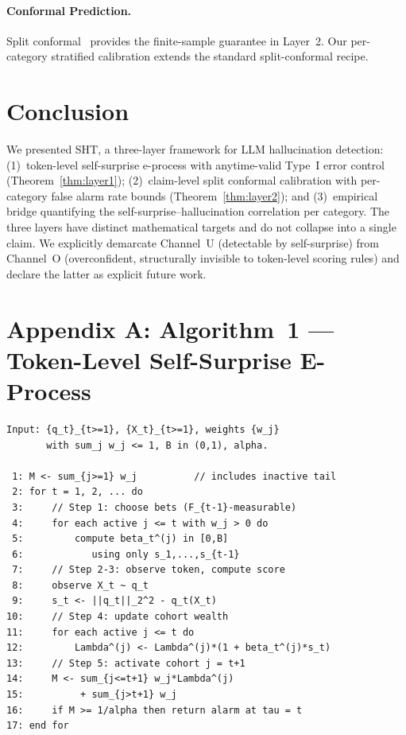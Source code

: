\documentclass[runningheads]{llncs}
\begin{document}
\paragraph{Conformal Prediction.}
Split conformal~\cite{vovk2005algorithmic,lei2018distribution} provides the
finite-sample guarantee in Layer~2. Our per-category stratified calibration
extends the standard split-conformal recipe.

\section{Conclusion}

We presented SHT, a three-layer framework for LLM hallucination detection:
(1)~token-level self-surprise e-process with anytime-valid Type~I error
control (Theorem~\ref{thm:layer1});
(2)~claim-level split conformal calibration with per-category false alarm
rate bounds (Theorem~\ref{thm:layer2}); and
(3)~empirical bridge quantifying the self-surprise--hallucination correlation
per category.
The three layers have distinct mathematical targets and do not collapse into
a single claim. We explicitly demarcate Channel~U (detectable by self-surprise)
from Channel~O (overconfident, structurally invisible to token-level scoring
rules) and declare the latter as explicit future work.

\section*{Appendix A: Algorithm~1 --- Token-Level Self-Surprise E-Process}

\begin{verbatim}
Input: {q_t}_{t>=1}, {X_t}_{t>=1}, weights {w_j}
       with sum_j w_j <= 1, B in (0,1), alpha.

 1: M <- sum_{j>=1} w_j          // includes inactive tail
 2: for t = 1, 2, ... do
 3:     // Step 1: choose bets (F_{t-1}-measurable)
 4:     for each active j <= t with w_j > 0 do
 5:         compute beta_t^(j) in [0,B]
 6:            using only s_1,...,s_{t-1}
 7:     // Step 2-3: observe token, compute score
 8:     observe X_t ~ q_t
 9:     s_t <- ||q_t||_2^2 - q_t(X_t)
10:     // Step 4: update cohort wealth
11:     for each active j <= t do
12:         Lambda^(j) <- Lambda^(j)*(1 + beta_t^(j)*s_t)
13:     // Step 5: activate cohort j = t+1
14:     M <- sum_{j<=t+1} w_j*Lambda^(j)
15:          + sum_{j>t+1} w_j
16:     if M >= 1/alpha then return alarm at tau = t
17: end for
\end{verbatim}
\end{document}
